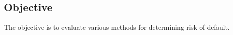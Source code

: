 \subsection{Objective}

The objective is to evaluate various methods for determining risk of default.  
